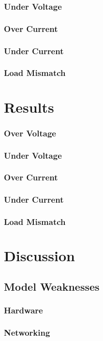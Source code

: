 \documentclass[11pt,conference,draftcls,onecolumn]{IEEEtran}
\begin{document}
\subsubsection{Under Voltage}
\subsubsection{Over Current}
\subsubsection{Under Current}
\subsubsection{Load Mismatch}

\section{Results}\label{sec:results}
\subsubsection{Over Voltage}
\subsubsection{Under Voltage}
\subsubsection{Over Current}
\subsubsection{Under Current}
\subsubsection{Load Mismatch}

\section{Discussion}\label{sec:discussion}
\subsection{Model Weaknesses}
\subsubsection{Hardware}
\subsubsection{Networking}
\end{document}

